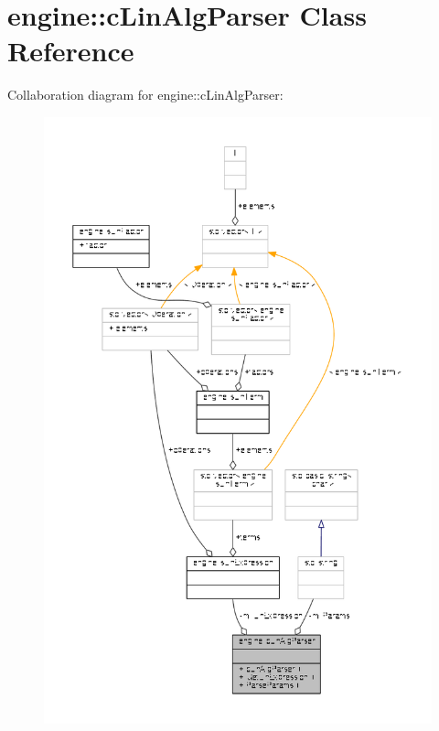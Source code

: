 \hypertarget{classengine_1_1cLinAlgParser}{\section{engine\-:\-:c\-Lin\-Alg\-Parser Class Reference}
\label{classengine_1_1cLinAlgParser}
}


Collaboration diagram for engine\-:\-:c\-Lin\-Alg\-Parser\-:
\nopagebreak
\begin{figure}[H]
\begin{center}
\leavevmode
\includegraphics[width=350pt]{classengine_1_1cLinAlgParser__coll__graph}
\end{center}
\end{figure}
